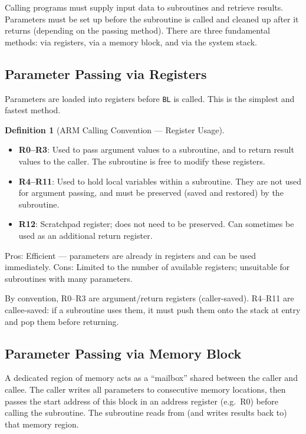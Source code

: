 \documentclass[11pt, a4paper, notitlepage]{report}
\theoremstyle{definition}
\newtheorem{definition}[theorem]{Definition}
\theoremstyle{remark}
\theoremstyle{definition}
\begin{document}
Calling programs must supply input data to subroutines and retrieve results. Parameters must be set up before the subroutine is called and cleaned up after it returns (depending on the passing method). There are three fundamental methods: via registers, via a memory block, and via the system stack.

\subsection{Parameter Passing via Registers}

Parameters are loaded into registers before \texttt{BL} is called. This is the simplest and fastest method.

\begin{definition}[ARM Calling Convention --- Register Usage]
\label{def:calling-convention}
\begin{itemize}
  \item \textbf{R0--R3}: Used to pass argument values to a subroutine, and to return result values to the caller. The subroutine is free to modify these registers.
  \item \textbf{R4--R11}: Used to hold local variables within a subroutine. They are not used for argument passing, and must be preserved (saved and restored) by the subroutine.
  \item \textbf{R12}: Scratchpad register; does not need to be preserved. Can sometimes be used as an additional return register.
\end{itemize}
\end{definition}

Pros: Efficient --- parameters are already in registers and can be used immediately. Cons: Limited to the number of available registers; unsuitable for subroutines with many parameters.

\begin{examtip}[title={Register Calling Convention}]
By convention, R0--R3 are argument/return registers (caller-saved). R4--R11 are callee-saved: if a subroutine uses them, it must push them onto the stack at entry and pop them before returning.
\end{examtip}

\subsection{Parameter Passing via Memory Block}

A dedicated region of memory acts as a ``mailbox'' shared between the caller and callee. The caller writes all parameters to consecutive memory locations, then passes the start address of this block in an address register (e.g.\ R0) before calling the subroutine. The subroutine reads from (and writes results back to) that memory region.
\end{document}
